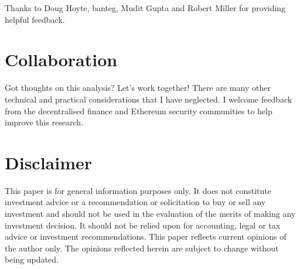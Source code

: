 \documentclass[a4paper, 11pt]{article}
\begin{document}
Thanks to Doug Hoyte, banteg, Mudit Gupta and Robert Miller for providing helpful feedback. 

\section{Collaboration}

Got thoughts on this analysis? Let's work together! There are many other technical and practical considerations that I have neglected. I welcome feedback from the decentralised finance and Ethereum security communities to help improve this research.    

\section{Disclaimer}

This paper is for general information purposes only. It does not constitute investment advice or a recommendation or solicitation to buy or sell any investment and should not be used in the evaluation of the merits of making any investment decision. It should not be relied upon for accounting, legal or tax advice or investment recommendations. This paper reflects current opinions of the author only. The opinions reflected herein are subject to change without being updated.
\end{document}
